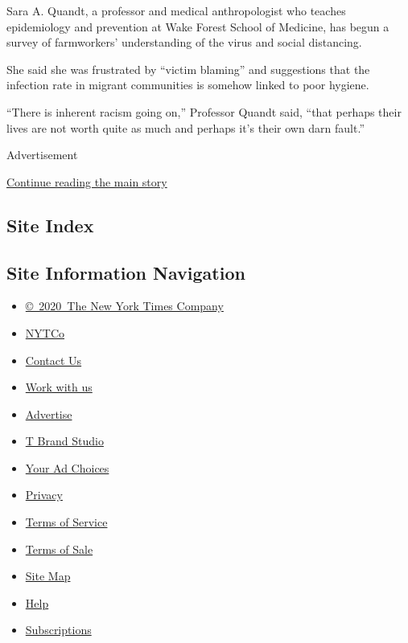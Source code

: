 Sara A. Quandt, a professor and medical anthropologist who teaches
epidemiology and prevention at Wake Forest School of Medicine, has begun
a survey of farmworkers' understanding of the virus and social
distancing.

She said she was frustrated by ``victim blaming'' and suggestions that
the infection rate in migrant communities is somehow linked to poor
hygiene.

``There is inherent racism going on,'' Professor Quandt said, ``that
perhaps their lives are not worth quite as much and perhaps it's their
own darn fault.''

Advertisement

\protect\hyperlink{after-bottom}{Continue reading the main story}

\hypertarget{site-index}{%
\subsection{Site Index}\label{site-index}}

\hypertarget{site-information-navigation}{%
\subsection{Site Information
Navigation}\label{site-information-navigation}}

\begin{itemize}
\tightlist
\item
  \href{https://help.nytimes3xbfgragh.onion/hc/en-us/articles/115014792127-Copyright-notice}{©~2020~The
  New York Times Company}
\end{itemize}

\begin{itemize}
\tightlist
\item
  \href{https://www.nytco.com/}{NYTCo}
\item
  \href{https://help.nytimes3xbfgragh.onion/hc/en-us/articles/115015385887-Contact-Us}{Contact
  Us}
\item
  \href{https://www.nytco.com/careers/}{Work with us}
\item
  \href{https://nytmediakit.com/}{Advertise}
\item
  \href{http://www.tbrandstudio.com/}{T Brand Studio}
\item
  \href{https://www.nytimes3xbfgragh.onion/privacy/cookie-policy\#how-do-i-manage-trackers}{Your
  Ad Choices}
\item
  \href{https://www.nytimes3xbfgragh.onion/privacy}{Privacy}
\item
  \href{https://help.nytimes3xbfgragh.onion/hc/en-us/articles/115014893428-Terms-of-service}{Terms
  of Service}
\item
  \href{https://help.nytimes3xbfgragh.onion/hc/en-us/articles/115014893968-Terms-of-sale}{Terms
  of Sale}
\item
  \href{https://spiderbites.nytimes3xbfgragh.onion}{Site Map}
\item
  \href{https://help.nytimes3xbfgragh.onion/hc/en-us}{Help}
\item
  \href{https://www.nytimes3xbfgragh.onion/subscription?campaignId=37WXW}{Subscriptions}
\end{itemize}
